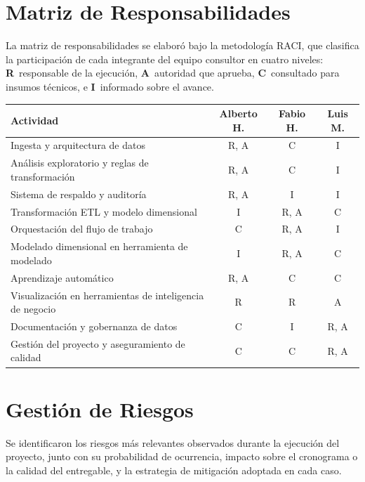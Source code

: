 \documentclass[12pt,a4paper]{article}
\begin{document}
\newpage
\section{Matriz de Responsabilidades}

La matriz de responsabilidades se elaboró bajo la metodología RACI, que clasifica la
participación de cada integrante del equipo consultor en cuatro niveles: \textbf{R}~responsable
de la ejecución, \textbf{A}~autoridad que aprueba, \textbf{C}~consultado para insumos técnicos,
e \textbf{I}~informado sobre el avance.

\vspace{6pt}
{\small
\begin{tabularx}{\linewidth}{@{} X c c c @{}}
  \toprule
  \textbf{Actividad}
    & \textbf{Alberto H.}
    & \textbf{Fabio H.}
    & \textbf{Luis M.} \\
  \midrule
  Ingesta y arquitectura de datos               & R, A & C    & I    \\[3pt]
  Análisis exploratorio y reglas de transformación & R, A & C  & I    \\[3pt]
  Sistema de respaldo y auditoría               & R, A & I    & I    \\[3pt]
  Transformación ETL y modelo dimensional       & I    & R, A & C    \\[3pt]
  Orquestación del flujo de trabajo             & C    & R, A & I    \\[3pt]
  Modelado dimensional en herramienta de modelado & I  & R, A & C    \\[3pt]
  Aprendizaje automático                        & R, A & C    & C    \\[3pt]
  Visualización en herramientas de inteligencia de negocio & R & R & A \\[3pt]
  Documentación y gobernanza de datos           & C    & I    & R, A \\[3pt]
  Gestión del proyecto y aseguramiento de calidad & C  & C    & R, A \\
  \bottomrule
\end{tabularx}
}

\newpage
\section{Gestión de Riesgos}

Se identificaron los riesgos más relevantes observados durante la ejecución del proyecto, junto
con su probabilidad de ocurrencia, impacto sobre el cronograma o la calidad del entregable, y la
estrategia de mitigación adoptada en cada caso.
\end{document}
